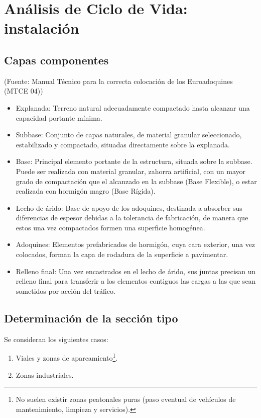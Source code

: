 \chapter{Análisis de Ciclo de Vida: instalación}
\section{Capas componentes}

(Fuente: Manual Técnico para la correcta colocación de los Euroadoquines (MTCE 04))

\begin{itemize}
\item Explanada: Terreno natural adecuadamente compactado hasta alcanzar una capacidad portante mínima.
\item Subbase: Conjunto de capas naturales, de material granular seleccionado, estabilizado y compactado, situadas directamente sobre la explanada.
\item Base: Principal elemento portante de la estructura, situada sobre la subbase. Puede ser realizada con material granular, zahorra artificial, con un mayor grado de compactación que el alcanzado en la subbase (Base Flexible), o estar realizada con hormigón magro (Base Rígida).
\item Lecho de árido: Base de apoyo de los adoquines, destinada a absorber sus diferencias de espesor debidas a la tolerancia de fabricación, de manera que estos una vez compactados formen una superficie homogénea.
\item Adoquines: Elementos prefabricados de hormigón, cuya cara exterior, una vez colocados, forman la capa de rodadura de la superficie a pavimentar.
\item Relleno final: Una vez encastrados en el lecho de árido, sus juntas precisan un relleno final para transferir a los elementos contiguos las cargas a las que sean sometidos por acción del tráfico.
\end{itemize}

\section{Determinación de la sección tipo}\label{sec:secciontipo}

Se consideran los siguientes casos:

\begin{enumerate}
\item Viales y zonas de aparcamiento\footnote{No suelen existir zonas peatonales puras (paso eventual de vehículos de mantenimiento, limpieza y servicios).}.
\item Zonas industriales.
\end{enumerate}


